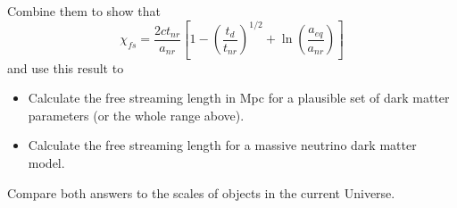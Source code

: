 \documentclass[12pt]{article}
\begin{document}
Combine them to show that
\begin{equation}
    \chi_{fs} = \frac{2 c t_{nr}}{a_{nr}} \left[1 - \left(\frac{t_d}{t_{nr}}\right)^{1/2} + \ln{\left(\frac{a_{eq}}{a_{nr}}\right)}\right]
\end{equation}
and use this result to
\begin{itemize}
    \item Calculate the free streaming length in Mpc for a plausible set of dark matter parameters (or the whole range above).
    \item Calculate the free streaming length for a massive neutrino dark matter model.
\end{itemize}
Compare both answers to the scales of objects in the current Universe.
\end{document}
